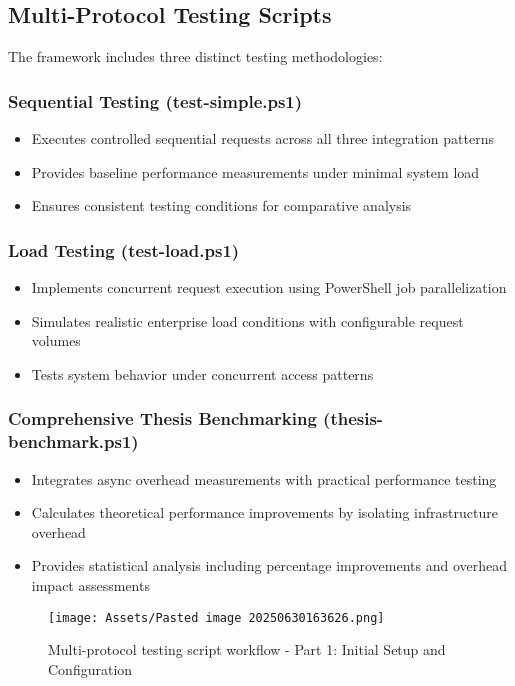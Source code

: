 \subsection{Multi-Protocol Testing Scripts}

The framework includes three distinct testing methodologies:

\subsubsection{Sequential Testing (test-simple.ps1)}
\begin{itemize}
    \item Executes controlled sequential requests across all three integration patterns
    \item Provides baseline performance measurements under minimal system load
    \item Ensures consistent testing conditions for comparative analysis
\end{itemize}

\subsubsection{Load Testing (test-load.ps1)}
\begin{itemize}
    \item Implements concurrent request execution using PowerShell job parallelization
    \item Simulates realistic enterprise load conditions with configurable request volumes
    \item Tests system behavior under concurrent access patterns
\end{itemize}

\subsubsection{Comprehensive Thesis Benchmarking (thesis-benchmark.ps1)}
\begin{itemize}
    \item Integrates async overhead measurements with practical performance testing
    \item Calculates theoretical performance improvements by isolating infrastructure overhead
    \item Provides statistical analysis including percentage improvements and overhead impact assessments
\end{itemize}

\begin{figure}[H]
    \centering
    \texttt{[image: Assets/Pasted image 20250630163626.png]}
    \caption{Multi-protocol testing script workflow - Part 1: Initial Setup and Configuration}
    \label{fig:testing_workflow_part1}
\end{figure}

